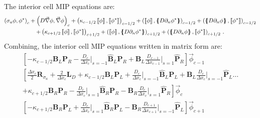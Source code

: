 \documentclass[11pt]{article}
\newcommand{\del}{\ensuremath{ \vec{\nabla} }}
\newcommand{\jmp}[1]{\ensuremath{\left\llbracket #1 \right\rrbracket}}
\newcommand{\avg}[1]{\ensuremath{ \left \{ \hspace{-0.055in} \left \{ #1  \right \}\hspace{-0.055in} \right \} }}
\newcommand{\pep}{\, .}
\begin{document}
%
The interior cell MIP equations are:
\begin{multline*}
\left( \sigma_a\phi,\phi^* \right)_c + \left( D\del\phi,\del\phi \right)_c
 +\left( \kappa_{c-1/2} \jmp{\phi},\jmp{\phi^*}\right)_{c-1/2} 
 +\left(  \jmp{\phi}, \avg{ D\partial_n \phi^*}\right)_{c-1/2} 
 +\left( \avg{D\partial_n\phi}, \jmp{\phi^*} \right)_{c-1/2} \\
  +\left( \kappa_{c+1/2} \jmp{\phi},\jmp{\phi^*}\right)_{c+1/2} 
 +\left(  \jmp{\phi}, \avg{ D\partial_n \phi^*}\right)_{c+1/2} 
 +\left( \avg{D\partial_n\phi}, \jmp{\phi^*} \right)_{c+1/2} \pep
\end{multline*}
%
%
Combining, the interior cell MIP equations written in matrix form are:
\begin{multline}
\left[ -\kappa_{c-1/2}\mathbf{B}_L\mathbf{P}_R - \frac{D_c}{\Delta x_c} \bigg \lvert_{s=-1} \widehat{\mathbf B}_L  \mathbf{P}_R + \mathbf{B}_L \frac{D_{c-1}}{\Delta x_{c-1}}\bigg \lvert_{s=1} \widehat{\mathbf P}_R \right]\vec{\phi}_{c-1} \\
%
%
\left[\frac{\Delta x_c}{2}\mathbf{R}_{\sigma_a} + \frac{2}{\Delta x_c}\mathbf{L}_D + \kappa_{c-1/2}\mathbf{B}_L\mathbf{P}_L + \frac{D_c}{\Delta x_c} \bigg \lvert_{s=-1} \widehat{\mathbf B}_L \mathbf{P}_L  + \mathbf{B}_L \frac{D_c}{\Delta x_c} \bigg \lvert_{s=-1} \widehat{\mathbf P}_L \dots \right. \\
\left. + \kappa_{c+1/2}\mathbf{B}_R \mathbf{P}_R - \frac{D_c}{\Delta x_c}\bigg \lvert_{s=1}\widehat{\mathbf B}_R \mathbf{P}_R -\mathbf{ B}_R \frac{D_c}{\Delta x_c}\bigg \lvert_{s=1} \widehat{\mathbf P}_R \right] \vec{\phi}_c \\
%
%
\left[ -\kappa_{c+1/2}\mathbf{B}_R \mathbf{P}_L + \frac{D_c}{\Delta x_c}\bigg \lvert_{s=1}\widehat{\mathbf B}_R \mathbf{P}_L - \mathbf{ B}_R \frac{D_{c+1}}{\Delta x_{c+1}} \bigg \lvert_{s=-1} \widehat{\mathbf P}_L \right] \vec{\phi}_{c+1}
\end{multline}
%
\end{document}

